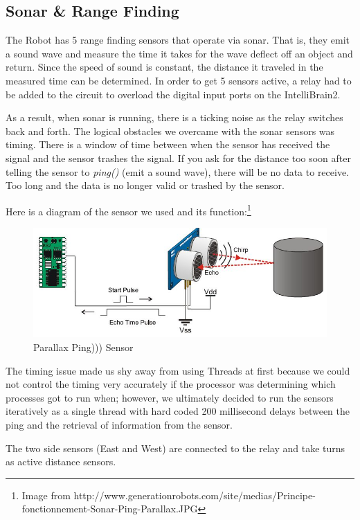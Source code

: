 \documentclass[12pt]{article}
\begin{document}
\clearpage
\subsection{Sonar \& Range Finding}
The Robot has 5 range finding sensors that operate via sonar.  That is, they emit a sound wave and measure the time it takes for the wave deflect off an object and return.  Since the speed of sound is constant, the distance it traveled in the measured time can be determined.  In order to get 5 sensors active, a relay had to be added to the circuit to overload the digital input ports on the IntelliBrain2.

	As a result, when sonar is running, there is a ticking noise as the relay switches back and forth.  The logical obstacles we overcame with the sonar sensors was timing.  There is a window of time between when the sensor has received the signal and the sensor trashes the signal.  If you ask for the distance too soon after telling the sensor to \textit{ping()} (emit a sound wave), there will be no data to receive.  Too long and the data is no longer valid or trashed by the sensor.

Here is a diagram of the sensor we used and its function:\footnote{Image from http://www.generationrobots.com/site/medias/Principe-fonctionnement-Sonar-Ping-Parallax.JPG}

\begin{figure}[h]
\centerline{\includegraphics[scale=.8]{img/sonar}}
\caption{Parallax Ping))) Sensor}
\end{figure}

The timing issue made us shy away from using Threads at first because we could not control the timing very accurately if the processor was determining which processes got to run when; however, we ultimately decided to run the sensors iteratively as a single thread with hard coded 200 millisecond delays between the ping and the retrieval of information from the sensor.

The two side sensors (East and West) are connected to the relay and take turns as active distance sensors.
\end{document}
